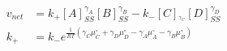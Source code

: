 \begin{eqnarray}
v_{net} & = k_+[A]_{SS}^{\gamma_A}[B]_{SS}^{\gamma_B} - k_-[C]_^{\gamma_C}[D]_{SS}^{\gamma_D} \\
k_+ &=  k_-e^{\frac{1}{RT}\left(\gamma_C\mu_C^\circ+ \gamma_D\mu_D^\circ -\gamma_A\mu_A^\circ-\gamma_B\mu_B^\circ\right)} \\
\end{eqnarray}